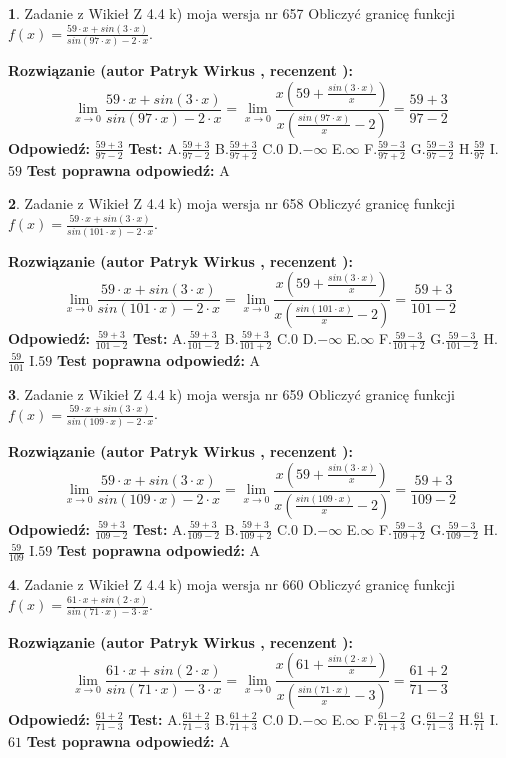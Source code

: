 \documentclass[12pt, a4paper]{article}
\theoremstyle{definition} %
\newtheorem{zad}{}
\newcommand{\zadStart}[1]{\begin{zad}#1\newline}
\newcommand{\zadStop}{\end{zad}}
\newcommand{\rozwStart}[2]{\noindent \textbf{Rozwiązanie (autor #1 , recenzent #2): }\newline}
\newcommand{\rozwStop}{\newline}
\newcommand{\odpStart}{\noindent \textbf{Odpowiedź:}\newline}
\newcommand{\odpStop}{\newline}
\newcommand{\testStart}{\noindent \textbf{Test:}\newline}
\newcommand{\testStop}{\newline}
\newcommand{\kluczStart}{\noindent \textbf{Test poprawna odpowiedź:}\newline}
\newcommand{\kluczStop}{\newline}
\begin{document}
\zadStart{Zadanie z Wikieł Z 4.4 k) moja wersja nr 657}
Obliczyć granicę funkcji $f(x)=\frac{59\cdot x +sin(3\cdot x)}{sin(97\cdot x) -2\cdot x}$.
\zadStop
\rozwStart{Patryk Wirkus}{}
$$\lim\limits_{x\to 0}\frac{59\cdot x +sin(3\cdot x)}{sin(97\cdot x) -2\cdot x}
=\lim\limits_{x\to 0}\frac{x(59+\frac{sin(3\cdot x)}{x})}{x(\frac{sin(97\cdot x)}{x}-2)}
=\frac{59+3}{97-2}$$
\rozwStop
\odpStart
$\frac{59+3}{97-2}$
\odpStop
\testStart
A.$\frac{59+3}{97-2}$
B.$\frac{59+3}{97+2}$
C.$0$
D.$-\infty$
E.$\infty$
F.$\frac{59-3}{97+2}$
G.$\frac{59-3}{97-2}$
H.$\frac{59}{97}$
I.$59$
\testStop
\kluczStart
A
\kluczStop



\zadStart{Zadanie z Wikieł Z 4.4 k) moja wersja nr 658}
Obliczyć granicę funkcji $f(x)=\frac{59\cdot x +sin(3\cdot x)}{sin(101\cdot x) -2\cdot x}$.
\zadStop
\rozwStart{Patryk Wirkus}{}
$$\lim\limits_{x\to 0}\frac{59\cdot x +sin(3\cdot x)}{sin(101\cdot x) -2\cdot x}
=\lim\limits_{x\to 0}\frac{x(59+\frac{sin(3\cdot x)}{x})}{x(\frac{sin(101\cdot x)}{x}-2)}
=\frac{59+3}{101-2}$$
\rozwStop
\odpStart
$\frac{59+3}{101-2}$
\odpStop
\testStart
A.$\frac{59+3}{101-2}$
B.$\frac{59+3}{101+2}$
C.$0$
D.$-\infty$
E.$\infty$
F.$\frac{59-3}{101+2}$
G.$\frac{59-3}{101-2}$
H.$\frac{59}{101}$
I.$59$
\testStop
\kluczStart
A
\kluczStop



\zadStart{Zadanie z Wikieł Z 4.4 k) moja wersja nr 659}
Obliczyć granicę funkcji $f(x)=\frac{59\cdot x +sin(3\cdot x)}{sin(109\cdot x) -2\cdot x}$.
\zadStop
\rozwStart{Patryk Wirkus}{}
$$\lim\limits_{x\to 0}\frac{59\cdot x +sin(3\cdot x)}{sin(109\cdot x) -2\cdot x}
=\lim\limits_{x\to 0}\frac{x(59+\frac{sin(3\cdot x)}{x})}{x(\frac{sin(109\cdot x)}{x}-2)}
=\frac{59+3}{109-2}$$
\rozwStop
\odpStart
$\frac{59+3}{109-2}$
\odpStop
\testStart
A.$\frac{59+3}{109-2}$
B.$\frac{59+3}{109+2}$
C.$0$
D.$-\infty$
E.$\infty$
F.$\frac{59-3}{109+2}$
G.$\frac{59-3}{109-2}$
H.$\frac{59}{109}$
I.$59$
\testStop
\kluczStart
A
\kluczStop



\zadStart{Zadanie z Wikieł Z 4.4 k) moja wersja nr 660}
Obliczyć granicę funkcji $f(x)=\frac{61\cdot x +sin(2\cdot x)}{sin(71\cdot x) -3\cdot x}$.
\zadStop
\rozwStart{Patryk Wirkus}{}
$$\lim\limits_{x\to 0}\frac{61\cdot x +sin(2\cdot x)}{sin(71\cdot x) -3\cdot x}
=\lim\limits_{x\to 0}\frac{x(61+\frac{sin(2\cdot x)}{x})}{x(\frac{sin(71\cdot x)}{x}-3)}
=\frac{61+2}{71-3}$$
\rozwStop
\odpStart
$\frac{61+2}{71-3}$
\odpStop
\testStart
A.$\frac{61+2}{71-3}$
B.$\frac{61+2}{71+3}$
C.$0$
D.$-\infty$
E.$\infty$
F.$\frac{61-2}{71+3}$
G.$\frac{61-2}{71-3}$
H.$\frac{61}{71}$
I.$61$
\testStop
\kluczStart
A
\kluczStop
\end{document}
